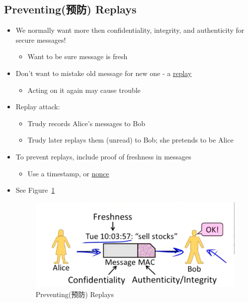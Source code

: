 \documentclass[12pt]{ctexart}   %
\begin{document}
	\subsection{Preventing(预防) Replays}
	\begin{itemize}
		\item We normally want more then confidentiality, integrity, and authenticity for secure messages!
		\begin{itemize}
			\item Want to be sure message is fresh
		\end{itemize}

		\item  Don't want to mistake old message for new one - a \underline{replay}
		\begin{itemize}
			\item Acting on it again may cause trouble
		\end{itemize}

		\item Replay attack:
		\begin{itemize}
			\item Trudy records Alice's messages to Bob
			\item Trudy later replays them (unread) to Bob; she pretends to be Alice
		\end{itemize}

		\item To prevent replays, include proof of freshness in messages
		\begin{itemize}
			\item Use a timestamp, or \underline{nonce}
		\end{itemize}
		\item See Figure~\ref{fig:10-3-9}
		  
		\begin{figure}[h!] %
		\centering
		\includegraphics[scale=0.7]{images/10-3-9}
		\caption{Preventing(预防) Replays}
		\label{fig:10-3-9}
		\end{figure}
	\end{itemize}
\end{document}
